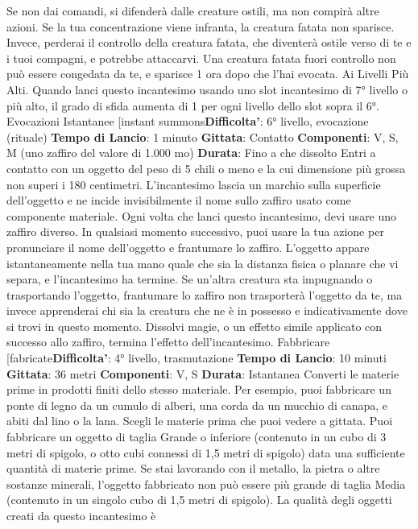 \begin{multicols}{2}
Se non dai comandi, si difenderà dalle creature ostili,
ma non compirà altre azioni.
Se la tua concentrazione viene infranta, la creatura
fatata non sparisce. Invece, perderai il controllo della
creatura fatata, che diventerà ostile verso di te e i tuoi
compagni, e potrebbe attaccarvi. Una creatura fatata
fuori controllo non può essere congedata da te, e
sparisce 1 ora dopo che l’hai evocata.
Ai Livelli Più Alti. Quando lanci questo incantesimo
usando uno slot incantesimo di 7° livello o più alto, il
grado di sfida aumenta di 1 per ogni livello dello slot
sopra il 6°.
Evocazioni Istantanee
[instant summons\textbf{Difficolta'}:
6° livello, evocazione (rituale)
\textbf{Tempo di Lancio}: 1 minuto
\textbf{Gittata}: Contatto
\textbf{Componenti}: V, S, M (uno zaffiro del valore di 1.000
mo)
\textbf{Durata}: Fino a che dissolto
Entri a contatto con un oggetto del peso di 5 chili o
meno e la cui dimensione più grossa non superi i 180
centimetri. L’incantesimo lascia un marchio sulla
superficie dell’oggetto e ne incide invisibilmente il nome
sullo zaffiro usato come componente materiale. Ogni
volta che lanci questo incantesimo, devi usare uno
zaffiro diverso.
In qualsiasi momento successivo, puoi usare la tua
azione per pronunciare il nome dell’oggetto e
frantumare lo zaffiro. L’oggetto appare istantaneamente
nella tua mano quale che sia la distanza fisica o planare
che vi separa, e l’incantesimo ha termine.
Se un’altra creatura sta impugnando o trasportando
l’oggetto, frantumare lo zaffiro non trasporterà l’oggetto
da te, ma invece apprenderai chi sia la creatura che ne
è in possesso e indicativamente dove si trovi in questo
momento.
Dissolvi magie, o un effetto simile applicato con
successo allo zaffiro, termina l’effetto dell’incantesimo.
Fabbricare
[fabricate\textbf{Difficolta'}:
4° livello, trasmutazione
\textbf{Tempo di Lancio}: 10 minuti
\textbf{Gittata}: 36 metri
\textbf{Componenti}: V, S
\textbf{Durata}: Istantanea
Converti le materie prime in prodotti finiti dello stesso
materiale. Per esempio, puoi fabbricare un ponte di
legno da un cumulo di alberi, una corda da un mucchio
di canapa, e abiti dal lino o la lana.
Scegli le materie prima che puoi vedere a gittata. Puoi
fabbricare un oggetto di taglia Grande o inferiore
(contenuto in un cubo di 3 metri di spigolo, o otto cubi
connessi di 1,5 metri di spigolo) data una sufficiente
quantità di materie prime. Se stai lavorando con il
metallo, la pietra o altre sostanze minerali, l’oggetto
fabbricato non può essere più grande di taglia Media
(contenuto in un singolo cubo di 1,5 metri di spigolo). La
qualità degli oggetti creati da questo incantesimo è

\end{multicols}
